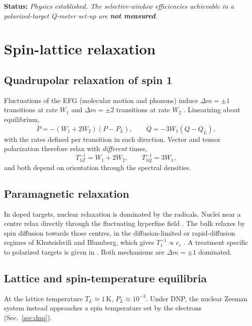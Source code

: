 \documentclass[11pt]{article}
\newcommand{\status}[1]{\par\noindent\textbf{\textsf{Status:}} \emph{#1}\par}
\begin{document}
\status{Physics established. The selective-window efficiencies achievable in a polarized-target
Q-meter set-up are \textbf{not measured}.}

\section{Spin-lattice relaxation}
\label{sec:t1}

\subsection{Quadrupolar relaxation of spin 1}
Fluctuations of the EFG (molecular motion and phonons) induce $\Delta m=\pm1$ transitions at
rate $W_1$ and $\Delta m=\pm2$ transitions at rate $W_2$ \cite{Abragam1961,Wasylishen2012}.
Linearizing about equilibrium,
\begin{equation}
\dot P=-(W_1+2W_2)(P-P_L),\qquad \dot Q=-3W_1(Q-Q_L),
\label{eq:t1pq}
\end{equation}
with the rates defined per transition in each direction. Vector and tensor polarization
therefore relax with \emph{different} times,
\[
T_{1Z}^{-1}=W_1+2W_2,\qquad T_{1Q}^{-1}=3W_1 ,
\]
and both depend on orientation through the spectral densities.

\subsection{Paramagnetic relaxation}
In doped targets, nuclear relaxation is dominated by the radicals. Nuclei near a centre relax
directly through the fluctuating hyperfine field \cite{Bloembergen1949,Blumberg1960}. The bulk
relaxes by spin diffusion towards those centres, in the diffusion-limited or rapid-diffusion
regimes of Khutsishvili and Blumberg, which gives $T_1^{-1}\propto c_e$
\cite{Blumberg1960,AbragamGoldman1978}. A treatment specific to polarized targets is given
in \cite{JiZhi1999}. Both mechanisms are $\Delta m=\pm1$ dominated.

\subsection{Lattice and spin-temperature equilibria}
\label{sec:equilibrium}
At the lattice temperature $T_L\simeq1$\,K, $P_L\approx 10^{-3}$. Under DNP, the nuclear
Zeeman system instead approaches a spin temperature set by the electrons
(Sec.~\ref{sec:dnp}).
\end{document}
